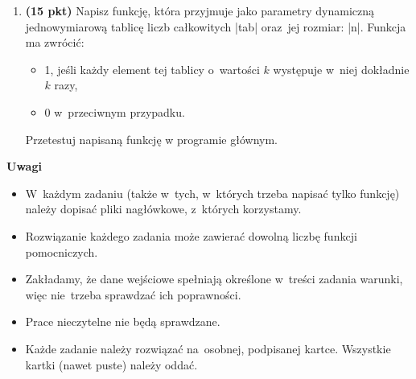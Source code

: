 \documentclass[extrafontsizes,10pt]{article}
\begin{document}
\begin{enumerate}
\item \textbf{(15 pkt)}
Napisz funkcję, która przyjmuje
jako parametry dynamiczną jednowymiarową
tablicę liczb całkowitych |tab|
oraz~jej rozmiar: |n|.
Funkcja ma zwrócić:
\begin{itemize}
\item
  1, jeśli każdy element tej tablicy
  o~wartości $k$ występuje w~niej
  dokładnie $k$ razy,
\item 0 w~przeciwnym przypadku.
\end{itemize}
\noindent Przetestuj napisaną funkcję w programie głównym.

\end{enumerate}

\vfill

\textbf{Uwagi}

\begin{itemize}
 \item W~każdym zadaniu (także w~tych,
       w~których trzeba napisać tylko funkcję)
       należy dopisać pliki nagłówkowe,
       z~których korzystamy.
 \item Rozwiązanie każdego zadania może zawierać
       dowolną liczbę funkcji pomocniczych.
 \item Zakładamy, że dane wejściowe spełniają
       określone w~treści zadania warunki,
       więc nie~trzeba sprawdzać ich poprawności.
 \item Prace nieczytelne nie będą sprawdzane.
 \item Każde zadanie należy rozwiązać na~osobnej,
       podpisanej kartce.
       Wszystkie kartki (nawet puste) należy oddać.
\end{itemize}
\end{document}
